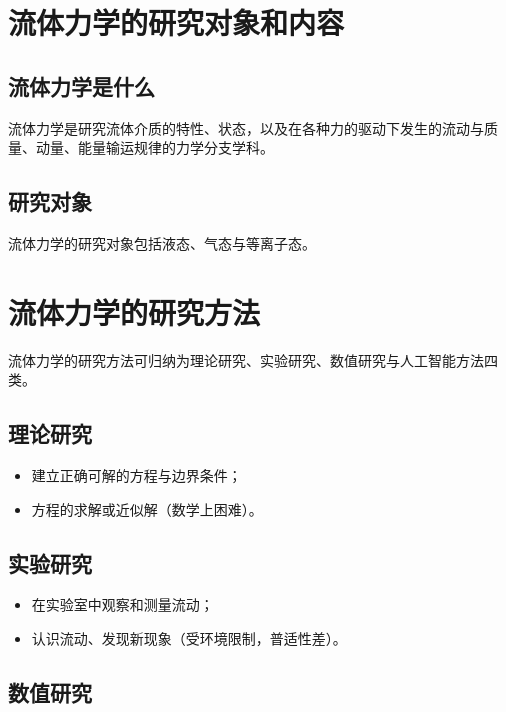 
\section{流体力学的研究对象和内容}

\subsection{流体力学是什么}

流体力学是研究流体介质的特性、状态，以及在各种力的驱动下发生的流动与质量、动量、能量输运规律的力学分支学科。

\subsection{研究对象}

流体力学的研究对象包括液态、气态与等离子态。

\section{流体力学的研究方法}

流体力学的研究方法可归纳为理论研究、实验研究、数值研究与人工智能方法四类。

\subsection{理论研究}

\begin{itemize}
	\item 建立正确可解的方程与边界条件；
	\item 方程的求解或近似解（数学上困难）。
\end{itemize}

\subsection{实验研究}

\begin{itemize}
	\item 在实验室中观察和测量流动；
	\item 认识流动、发现新现象（受环境限制，普适性差）。
\end{itemize}

\subsection{数值研究}

